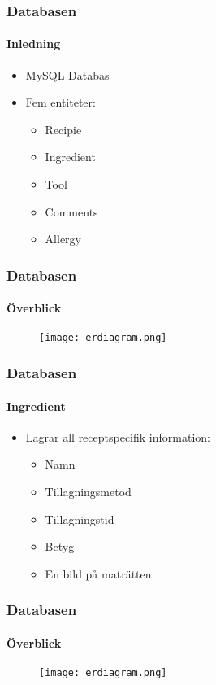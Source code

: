 
\begin{frame}
  \frametitle{Databasen}
  \framesubtitle{Inledning}
  \begin{itemize}
    \item<1-> MySQL Databas
    \item<2-> Fem entiteter:
      \begin{itemize}
      \item<3-> Recipie
      \item<4-> Ingredient
      \item<5-> Tool
      \item<6-> Comments
      \item<7-> Allergy
      \end{itemize}
  \end{itemize}
\end{frame}


\begin{frame}
  \frametitle{Databasen}
  \framesubtitle{Överblick}
  \begin{figure}[H]
        \centering 
        \texttt{[image: erdiagram.png]} 
        \label{fig:erdiagram}
\end{figure}
\end{frame}


\begin{frame}
  \frametitle{Databasen}
  \framesubtitle{Ingredient}
  \begin{itemize}
    \item<1-> Lagrar all receptspecifik information:
      \begin{itemize}
        \item Namn 
        \item Tillagningsmetod
        \item Tillagningstid
        \item Betyg
        \item En bild på maträtten
      \end{itemize}
 \end{itemize}
\end{frame}


\begin{frame}
  \frametitle{Databasen}
  \framesubtitle{Överblick}
  \begin{figure}[H]
        \centering 
        \texttt{[image: erdiagram.png]} 
        \label{fig:erdiagram}
\end{figure}
\end{frame}

